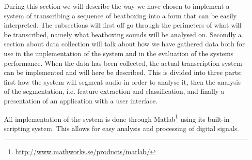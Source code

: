 During this section we will describe the way we have chosen to implement a system of transcribing a sequence of beatboxing into a form that can be easily interpreted. The subsections will first off go through the perimeters of what will be transcribed, namely what beatboxing sounds will be analysed on. Secondly a section about data collection will talk about how we have gathered data both for use in the implementation of the system and in the evaluation of the systems performance. When the data has been collected, the actual transcription system can be implemented and will here be described. This is divided into three parts: first how the system will segment audio in order to analyse it, then the analysis of the segmentation, i.e. feature extraction and classification, and finally a presentation of an application with a user interface.

All implementation of the system is done through Matlab\footnote{\url{http://www.mathworks.se/products/matlab/}} using its built-in scripting system. This allows for easy analysis and processing of digital signals.






